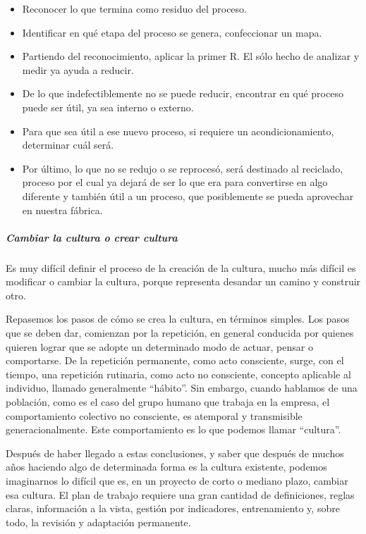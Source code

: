 \documentclass[
]{article}
\begin{document}
\begin{itemize}
\item
  Reconocer lo que termina como residuo del proceso.
\item
  Identificar en qué etapa del proceso se genera, confeccionar un mapa.
\item
  Partiendo del reconocimiento, aplicar la primer R. El sólo hecho de
  analizar y medir ya ayuda a reducir.
\item
  De lo que indefectiblemente no se puede reducir, encontrar en qué
  proceso puede ser útil, ya sea interno o externo.
\item
  Para que sea útil a ese nuevo proceso, si requiere un
  acondicionamiento, determinar cuál será.
\item
  Por último, lo que no se redujo o se reprocesó, será destinado al
  reciclado, proceso por el cual ya dejará de ser lo que era para
  convertirse en algo diferente y también útil a un proceso, que
  posiblemente se pueda aprovechar en nuestra fábrica.
\end{itemize}

\hypertarget{cambiar-la-cultura-o-crear-cultura}{%
\subparagraph{Cambiar la cultura o crear
cultura}\label{cambiar-la-cultura-o-crear-cultura}}

Es muy difícil definir el proceso de la creación de la cultura, mucho
más difícil es modificar o cambiar la cultura, porque representa
desandar un camino y construir otro.

Repasemos los pasos de cómo se crea la cultura, en términos simples. Los
pasos que se deben dar, comienzan por la repetición, en general
conducida por quienes quieren lograr que se adopte un determinado modo
de actuar, pensar o comportarse. De la repetición permanente, como acto
consciente, surge, con el tiempo, una repetición rutinaria, como acto no
consciente, concepto aplicable al individuo, llamado generalmente
``hábito''. Sin embargo, cuando hablamos de una población, como es el
caso del grupo humano que trabaja en la empresa, el comportamiento
colectivo no consciente, es atemporal y transmisible generacionalmente.
Este comportamiento es lo que podemos llamar ``cultura''.

Después de haber llegado a estas conclusiones, y saber que después de
muchos años haciendo algo de determinada forma es la cultura existente,
podemos imaginarnos lo difícil que es, en un proyecto de corto o mediano
plazo, cambiar esa cultura. El plan de trabajo requiere una gran
cantidad de definiciones, reglas claras, información a la vista, gestión
por indicadores, entrenamiento y, sobre todo, la revisión y adaptación
permanente.
\end{document}
